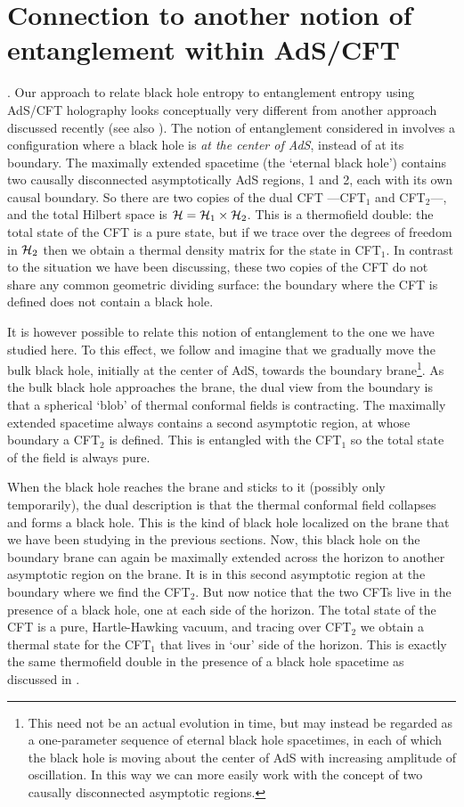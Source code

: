 \documentclass[12pt]{article}
\begin{document}
\section{Connection to another notion of
entanglement within AdS/CFT}. Our approach to relate
black hole entropy to entanglement entropy using AdS/CFT holography
looks conceptually very different from another approach discussed
recently \cite{malda} (see also \cite{brus}). The notion of entanglement
considered in \cite{malda} involves a configuration where a black hole
is {\it at the center of AdS}, instead of at its boundary. The maximally
extended spacetime (the `eternal black hole') contains two causally
disconnected asymptotically AdS regions, 1 and 2, each with its own
causal boundary. So there are two copies of the dual CFT ---CFT$_1$ and
CFT$_2$---, and the total Hilbert space is ${\cal H}={\cal
H}_1\times{\cal H}_2$. This is a thermofield double: the total state of
the CFT is a pure state, but if we trace
over the degrees of freedom in ${\cal H}_2$ then we obtain a thermal
density matrix for the state in CFT$_1$. In contrast to the situation we
have been discussing, these two copies of the CFT do not share any
common geometric dividing surface: the boundary where the CFT is defined
does not contain a black hole.

It is however possible to relate this notion of entanglement to the one
we have studied here. To this effect, we follow \cite{hms} and imagine
that we gradually move the bulk black hole, initially at the center of
AdS, towards the boundary brane\footnote{This need not be an actual
evolution in time, but may instead be regarded as a one-parameter
sequence of eternal black hole spacetimes, in each of which the black
hole is moving about the center of AdS with increasing amplitude of
oscillation. In this way we can more easily work with the concept of two
causally disconnected asymptotic regions.}. As the bulk black hole
approaches the brane, the dual view from the boundary is that a
spherical `blob' of thermal conformal fields is contracting. The
maximally extended spacetime always contains a second asymptotic region, at
whose boundary a CFT$_2$ is defined. This is entangled with the CFT$_1$
so the total state of the field is always pure. 

When the black hole reaches the brane and sticks to it (possibly only
temporarily), the dual description is that the thermal conformal field
collapses and forms a black hole. This is the kind of black hole
localized on the brane that we have been studying in the previous
sections. Now, this black hole on the boundary brane can again be
maximally extended across the horizon to another asymptotic region on
the brane. It is in this second asymptotic region at the boundary where
we find the CFT$_2$. But now notice that the two CFTs live in the
presence of a black hole, one at each side of the horizon. The total
state of the CFT is a pure, Hartle-Hawking vacuum, and tracing over
CFT$_2$ we obtain a thermal state for the CFT$_1$ that lives in `our'
side of the horizon. This is exactly the same thermofield double in the
presence of a black hole spacetime as discussed in \cite{israel}.
\end{document}
